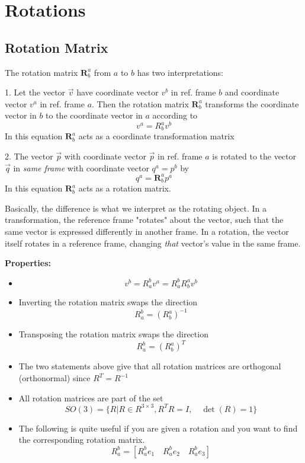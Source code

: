 \section{Rotations}
\subsection{Rotation Matrix}
The rotation matrix $\mathbf{R}_b^a$ from $a$ to $b$ has two interpretations:

1. Let the vector $\vec{v}$ have coordinate vector $v^b$ in ref. frame $b$ and coordinate vector $v^a$ in ref. frame $a$. Then the rotation matrix $\mathbf R_b^a$ transforms the coordinate vector in $b$ to the coordinate vector in $a$ according to
$$
v^a=R_b^a v^b
$$
In this equation $\mathbf{R}_b^a$ acts as a coordinate transformation matrix

2. The vector $\vec{p}$ with coordinate vector $\vec{p}$ in ref. frame $a$ is rotated to the vector $\vec{q}$ in \textit{same frame} with coordinate vector $q^a=p^b$ by
$$
q^a=\mathbf{R}_b^a p^a
$$
In this equation $\mathbf R_b^a$ acts as a rotation matrix.

Basically, the difference is what we interpret as the rotating object. In a transformation, the reference frame "rotates" about the vector, such that the same vector is expressed differently in another frame. In a rotation, the vector itself rotates in a reference frame, changing \textit{that} vector's value in the same frame.

\textbf{Properties:}
\begin{itemize}
    \item
    $$
    v^b=R^b_av^a=R^b_aR^a_bv^b
    $$
    \item Inverting the rotation matrix swaps the direction
    $$
    R_a^b=(R_b^a)^{-1}
    $$
    \item Transposing the rotation matrix swaps the direction
    $$
    R_a^b=(R_b^a)^T
    $$
    \item The two statements above give that all rotation matrices are orthogonal (orthonormal) since $R^T=R^{-1}$
    \item All rotation matrices are part of the set
    $$
    SO(3)=\{{R|R\in R^{3\times3}},R^TR=I,\quad \det{(R)}=1\}
    $$
    \item The following is quite useful if you are given a rotation and you want to find the corresponding rotation matrix. 
    $$
    R^b_a = [R^b_ae_1 \quad R^b_ae_2 \quad R^b_ae_3]
    $$
\end{itemize}

